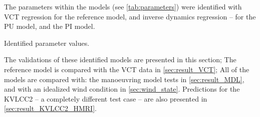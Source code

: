 The parameters within the models (see \autoref{tab:parameters}) were identified with VCT regression for the reference model, and inverse dynamics regression -- for the PU model, and the PI model. 
\begin{table}[h]
    \centering
    \caption{Identified parameter values.}
    \label{tab:parameters}
\end{table}

The validations of these identified models are presented in this section; The reference model is compared with the VCT data in \autoref{sec:result_VCT}; All of the models are compared with: the manoeuvring model tests in \autoref{sec:result_MDL}, and with an idealized wind condition in \autoref{sec:wind_state}.
Predictions for the KVLCC2 -- a completely different test case -- are also presented in \autoref{sec:result_KVLCC2_HMRI}.